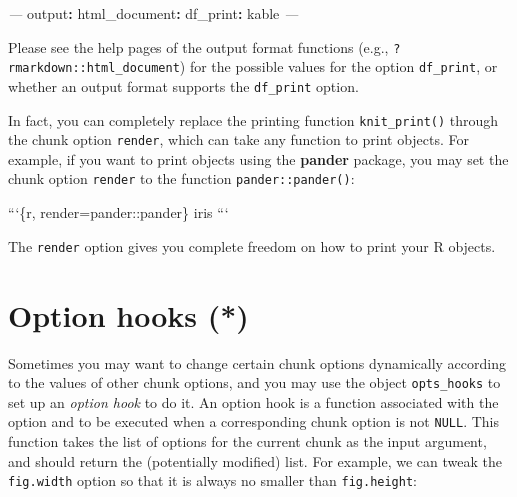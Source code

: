 \documentclass[
  11pt,
]{krantz}
\newenvironment{Shaded}{\begin{snugshade}}{\end{snugshade}}
\newcommand{\AttributeTok}[1]{\textcolor[rgb]{0.61,0.61,0.61}{#1}}
\newcommand{\BaseNTok}[1]{\textcolor[rgb]{0.06,0.06,0.06}{#1}}
\newcommand{\ControlFlowTok}[1]{\textcolor[rgb]{0.27,0.27,0.27}{\textbf{#1}}}
\newcommand{\DataTypeTok}[1]{\textcolor[rgb]{0.27,0.27,0.27}{#1}}
\newcommand{\FunctionTok}[1]{\textcolor[rgb]{0,0,0}{#1}}
\newcommand{\KeywordTok}[1]{\textcolor[rgb]{0.27,0.27,0.27}{\textbf{#1}}}
\newcommand{\NormalTok}[1]{#1}
\newcommand{\OperatorTok}[1]{\textcolor[rgb]{0.43,0.43,0.43}{\textbf{#1}}}
\newcommand{\PreprocessorTok}[1]{\textcolor[rgb]{0.37,0.37,0.37}{\textit{#1}}}
\newcommand{\StringTok}[1]{\textcolor[rgb]{0.5,0.5,0.5}{#1}}
\begin{document}
\begin{Shaded}
\begin{Highlighting}[]
\PreprocessorTok{---}
\FunctionTok{output}\KeywordTok{:}
\AttributeTok{  }\FunctionTok{html_document}\KeywordTok{:}
\AttributeTok{    }\FunctionTok{df_print}\KeywordTok{:}\AttributeTok{ kable}
\PreprocessorTok{---}
\end{Highlighting}
\end{Shaded}

Please see the help pages of the output format functions (e.g., \texttt{?rmarkdown::html\_document}) for the possible values for the option \texttt{df\_print}, or whether an output format supports the \texttt{df\_print} option.

In fact, you can completely replace the printing function \texttt{knit\_print()} through the chunk option \texttt{render}, which can take any function to print objects. For example, if you want to print objects using the \textbf{pander} package, you may set the chunk option \texttt{render} to the function \texttt{pander::pander()}:

\begin{Shaded}
\begin{Highlighting}[]
\BaseNTok{```\{r, render=pander::pander\}}
\BaseNTok{iris}
\BaseNTok{```}
\end{Highlighting}
\end{Shaded}

The \texttt{render} option gives you complete freedom on how to print your R objects.

\hypertarget{option-hooks}{%
\section{Option hooks (*)}\label{option-hooks}}

Sometimes you may want to change certain chunk options dynamically according to the values of other chunk options, and you may use the object \texttt{opts\_hooks} to set up an \emph{option hook} to do it. An option hook is a function associated with the option and to be executed when a corresponding chunk option is not \texttt{NULL}. This function takes the list of options for the current chunk as the input argument, and should return the (potentially modified) list. For example, we can tweak the \texttt{fig.width} option so that it is always no smaller than \texttt{fig.height}:

\begin{Shaded}
\end{Shaded}
\end{document}
